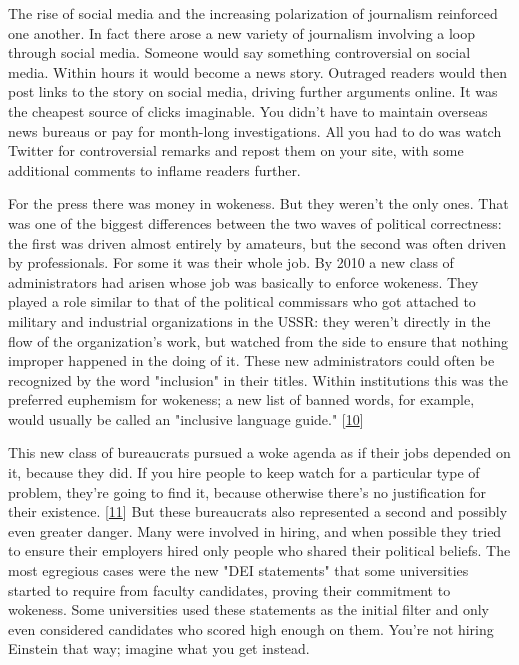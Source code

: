The rise of social
                  media and the increasing polarization of journalism reinforced
                  one another. In fact there arose a new variety of journalism
                  involving a loop through social media. Someone would say
                  something controversial on social media. Within hours it would
                  become a news story. Outraged readers would then post links to
                  the story on social media, driving further arguments online.
                  It was the cheapest source of clicks imaginable. You didn't
                  have to maintain overseas news bureaus or pay for month-long
                  investigations. All you had to do was watch Twitter for
                  controversial remarks and repost them on your site, with some
                  additional comments to inflame readers further.

For
                  the press there was money in wokeness. But they weren't the
                  only ones. That was one of the biggest differences between the
                  two waves of political correctness: the first was driven
                  almost entirely by amateurs, but the second was often driven
                  by professionals. For some it was their whole job. By 2010 a
                  new class of administrators had arisen whose job was basically
                  to enforce wokeness. They played a role similar to that of the
                  political commissars who got attached to military and
                  industrial organizations in the USSR: they weren't directly in
                  the flow of the organization's work, but watched from the side
                  to ensure that nothing improper happened in the doing of it.
                  These new administrators could often be recognized by the word
                  "inclusion" in their titles. Within institutions this was the
                  preferred euphemism for wokeness; a new list of banned words,
                  for example, would usually be called an "inclusive language
                  guide."
                  [\href{\#f10n}{10}]

This new class of bureaucrats pursued a woke
                  agenda as if their jobs depended on it, because they did. If
                  you hire people to keep watch for a particular type of
                  problem, they're going to find it, because otherwise there's
                  no justification for their existence.
                  [\href{\#f11n}{11}]
                  But these bureaucrats also represented a second and possibly
                  even greater danger. Many were involved in hiring, and when
                  possible they tried to ensure their employers hired only
                  people who shared their political beliefs. The most egregious
                  cases were the new "DEI statements" that some universities
                  started to require from faculty candidates, proving their
                  commitment to wokeness. Some universities used these
                  statements as the initial filter and only even considered
                  candidates who scored high enough on them. You're not hiring
                  Einstein that way; imagine what you get instead.

